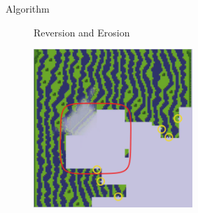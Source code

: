 \documentclass{beamer}
\begin{document}
  \begin{frame}[fragile]{Algorithm}

    \begin{figure}
      Reversion and Erosion

      \includegraphics[width=6cm]{img/fm_0036_reversion_erosion.pdf}

    \end{figure}
  \end{frame}

%




\end{document}
